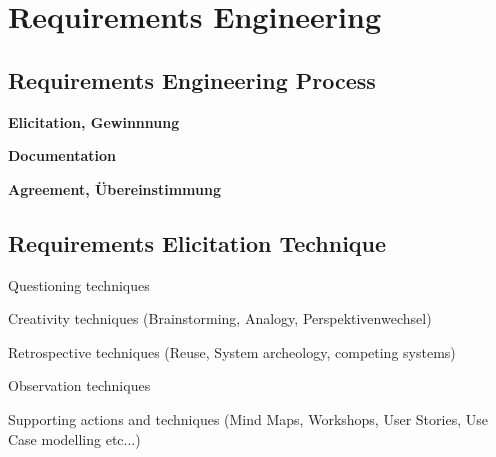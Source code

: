 \chapter{Requirements Engineering}

\section{Requirements Engineering Process}
\begin{compactitem}
    \item \textbf{Elicitation, Gewinnnung}
    \item \textbf{Documentation}
    \item \textbf{Agreement, Übereinstimmung}
\end{compactitem}

\section{Requirements Elicitation Technique}
\begin{compactitem}
    \item Questioning techniques
    \item Creativity techniques (Brainstorming, Analogy, Perspektivenwechsel)
    \item Retrospective techniques (Reuse, System archeology, competing systems)
    \item Observation techniques
    \item Supporting actions and techniques (Mind Maps, Workshops, User Stories,
    Use Case modelling etc...)
\end{compactitem}

